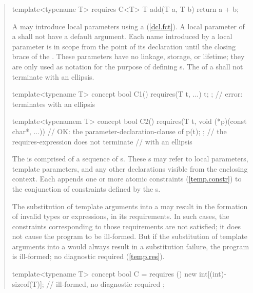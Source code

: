 \begin{quote}
\begin{codeblock}
template<typename T> requires C<T> 
  T add(T a, T b) { return a + b; }
\end{codeblock}
\exitnote

\pnum
A  may introduce local parameters using a
(\ref{dcl.fct}). 
%
A local parameter of a  shall not have a 
default argument.
%
Each name introduced by a local parameter is in scope from the point
of its declaration until the closing brace of the
.
%
These parameters have no linkage, storage, or lifetime; they are only used
as notation for the purpose of defining s.
%
The  of a 
 shall
not terminate with an ellipsis.
\enterexample
\begin{codeblock}
template<typename T>
  concept bool C1() { 
    requires(T t, ...) { t; }; // error: terminates with an ellipsis
  }

template<typenamem T>
  concept bool C2() { 
    requires(T t, void (*p)(const char*, ...)) // OK: the parameter-declaration-clause of
    { p(t); };                                 // the requires-expression does not terminate 
  }                                            // with an ellipsis
\end{codeblock}
\exitexample

\pnum
The  is comprised of 
a sequence of s.
%
These s may refer to local 
parameters, template parameters, and any other declarations visible from the 
enclosing context. 
%
Each  appends one or more atomic constraints
(\ref{temp.constr}) to the conjunction of constraints defined by the 
s.

\pnum
The substitution of template arguments into a  
may result in the formation of  invalid types or expressions, in its
requirements. In such cases, the constraints corresponding to those
requirements are not satisfied; it does not cause the program to be ill-formed.
%
\enternote
But if the substitution of template arguments into
a  would always result in
a substitution failure, the program is ill-formed; no diagnostic
required (\ref{temp.res}).
\exitnote
%
\enterexample
\begin{codeblock}
template<typename T> concept bool C =
  requires () {
    new int[(int)-sizeof(T)]; // ill-formed, no diagnostic required
  };
\end{codeblock}
\exitexample


\end{quote}
